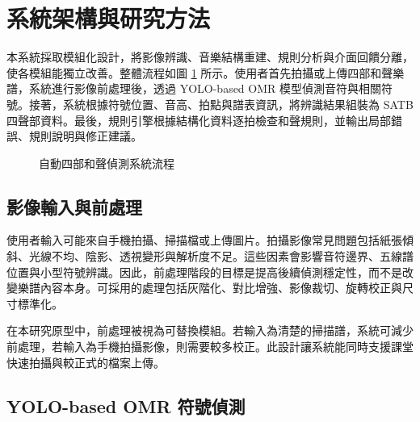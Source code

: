 \documentclass[12pt,a4paper]{article}
\begin{document}
\section{系統架構與研究方法}

本系統採取模組化設計，將影像辨識、音樂結構重建、規則分析與介面回饋分離，使各模組能獨立改善。整體流程如圖 \ref{fig:pipeline} 所示。使用者首先拍攝或上傳四部和聲樂譜，系統進行影像前處理後，透過 YOLO-based OMR 模型偵測音符與相關符號。接著，系統根據符號位置、音高、拍點與譜表資訊，將辨識結果組裝為 SATB 四聲部資料。最後，規則引擎根據結構化資料逐拍檢查和聲規則，並輸出局部錯誤、規則說明與修正建議。

\begin{figure}[htbp]
  \centering
  \caption{自動四部和聲偵測系統流程}
  \label{fig:pipeline}
\end{figure}

\subsection{影像輸入與前處理}

使用者輸入可能來自手機拍攝、掃描檔或上傳圖片。拍攝影像常見問題包括紙張傾斜、光線不均、陰影、透視變形與解析度不足。這些因素會影響音符邊界、五線譜位置與小型符號辨識。因此，前處理階段的目標是提高後續偵測穩定性，而不是改變樂譜內容本身。可採用的處理包括灰階化、對比增強、影像裁切、旋轉校正與尺寸標準化。

在本研究原型中，前處理被視為可替換模組。若輸入為清楚的掃描譜，系統可減少前處理，若輸入為手機拍攝影像，則需要較多校正。此設計讓系統能同時支援課堂快速拍攝與較正式的檔案上傳。

\subsection{YOLO-based OMR 符號偵測}
\end{document}
